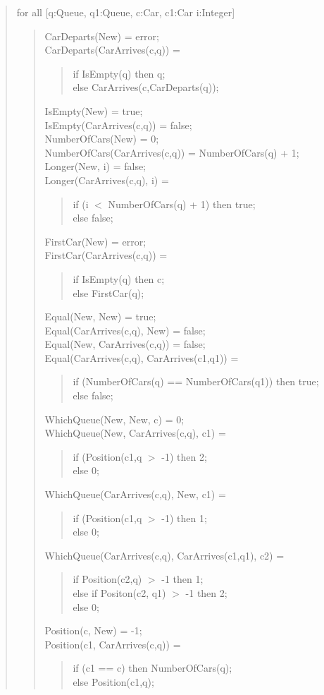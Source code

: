 \documentclass[letterpaper,12pt]{article}
\begin{document}
\begin{quote}
 \newpage
 for all [q:Queue, q1:Queue, c:Car, c1:Car i:Integer]
 \begin{quote}
  CarDeparts(New) = error;\\
  CarDeparts(CarArrives(c,q)) =
  \begin{quote}
   if IsEmpty(q) then q;\\
   else CarArrives(c,CarDeparts(q));
  \end{quote}
  IsEmpty(New) = true;\\
  IsEmpty(CarArrives(c,q)) = false;\\
  NumberOfCars(New) = 0;\\
  NumberOfCars(CarArrives(c,q)) = NumberOfCars(q) + 1;\\
  Longer(New, i) = false;\\
  Longer(CarArrives(c,q), i) =
  \begin{quote}
   if (i $<$ NumberOfCars(q) + 1) then true;\\
   else false;
  \end{quote}
  FirstCar(New) = error;\\
  FirstCar(CarArrives(c,q)) =
  \begin{quote}
   if IsEmpty(q) then c;\\
   else FirstCar(q);
  \end{quote}
  Equal(New, New) = true;\\
  Equal(CarArrives(c,q), New) = false;\\
  Equal(New, CarArrives(c,q)) = false;\\
  Equal(CarArrives(c,q), CarArrives(c1,q1)) =
  \begin{quote}
   if (NumberOfCars(q) == NumberOfCars(q1)) then true;\\
   else false;
  \end{quote}
  WhichQueue(New, New, c) = 0;\\
  WhichQueue(New, CarArrives(c,q), c1) =
  \begin{quote}
   if (Position(c1,q $>$ -1) then 2;\\
   else 0;
  \end{quote}
  WhichQueue(CarArrives(c,q), New, c1) =
  \begin{quote}
   if (Position(c1,q $>$ -1) then 1;\\
   else 0;
  \end{quote}
  \newpage
  WhichQueue(CarArrives(c,q), CarArrives(c1,q1), c2) =
  \begin{quote}
   if Position(c2,q) $>$ -1 then 1;\\
   else if Positon(c2, q1) $>$ -1 then 2;\\
   else 0;
  \end{quote}
  Position(c, New) = -1;\\
  Position(c1, CarArrives(c,q)) =
  \begin{quote}
   if (c1 == c) then NumberOfCars(q);\\
   else Position(c1,q);
  \end{quote}
  

\end{quote}
\end{quote}
\end{document}
